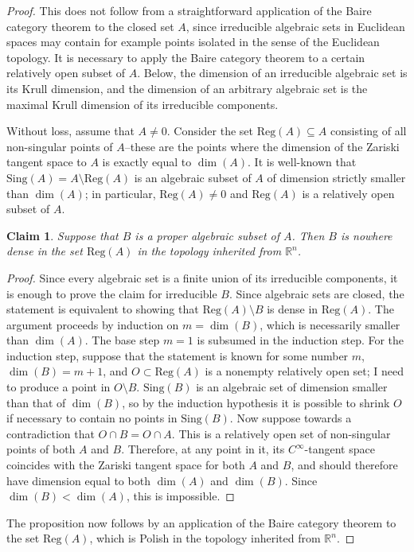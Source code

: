 \documentclass{article}
\newcommand{\sing}{\mathrm{Sing}}
\newcommand{\regg}{\mathrm{Reg}}
\newtheorem{claim}[theorem]{Claim}
\theoremstyle{definition}
\begin{document}
\begin{proof}
This does not follow from a straightforward application of the Baire category theorem to the closed set $A$, since irreducible algebraic sets in Euclidean spaces may contain for example points isolated in the sense of the Euclidean topology. It is necessary to apply the Baire category theorem to a certain relatively open subset of $A$. Below, the dimension of an irreducible algebraic set is its Krull dimension, and the dimension of an arbitrary algebraic set is the maximal Krull dimension of its irreducible components.


Without loss, assume that $A\neq 0$. Consider the set $\regg(A)\subseteq A$ consisting of all non-singular points of $A$--these are the points where the dimension of the Zariski tangent space to $A$ is exactly equal to $\dim(A)$. It is well-known \cite[Proposition 3.3.14] {bochnak:real} that $\sing(A)=A\setminus\regg(A)$ is an algebraic subset of $A$ of dimension strictly smaller than $\dim(A)$; in particular, $\regg(A)\neq 0$ and $\regg(A)$ is a relatively open subset of $A$.

\begin{claim}
Suppose that $B$ is a proper algebraic subset of $A$. Then $B$ is nowhere dense in the set $\regg(A)$ in the topology inherited from $\mathbb{R}^n$.
\end{claim}

\begin{proof}
Since every algebraic set is a finite union of its irreducible components, it is enough to prove the claim for irreducible $B$. Since algebraic sets are closed, the statement is equivalent to showing that $\regg(A)\setminus B$ is dense in $\regg(A)$. The argument proceeds by induction on $m=\dim(B)$, which is necessarily smaller than $\dim(A)$. The base step $m=1$ is subsumed in the induction step. For the induction step, suppose that the statement is known for some number $m$, $\dim(B)=m+1$, and $O\subset\regg(A)$ is a nonempty relatively open set; I need to produce a point in $O\setminus B$. $\sing(B)$ is an algebraic set of dimension smaller than that of $\dim(B)$, so by the induction hypothesis it is possible to shrink $O$ if necessary to contain no points in $\sing(B)$. Now suppose towards a contradiction that $O\cap B=O\cap A$. This is a relatively open set of non-singular points of both $A$ and $B$. Therefore, at any point in it, its $C^\infty$-tangent space coincides with the Zariski tangent space for both $A$ and $B$, and should therefore have dimension equal to both $\dim(A)$ and $\dim(B)$. Since $\dim(B)<\dim(A)$, this is impossible.
\end{proof}

The proposition now follows by an application of the Baire category theorem to the set $\regg(A)$, which is Polish in the topology inherited from $\mathbb{R}^n$.
\end{proof}
\end{document}
